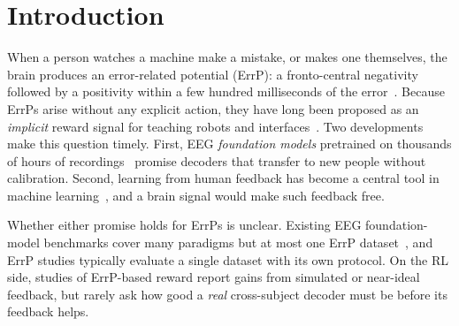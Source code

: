 \section{Introduction}
\label{sec:intro}

When a person watches a machine make a mistake, or makes one themselves, the brain produces an
error-related potential (ErrP): a fronto-central negativity followed by a positivity within a few hundred
milliseconds of the error~\citep{chavarriaga2014errare}. Because ErrPs arise without any explicit action,
they have long been proposed as an \emph{implicit} reward signal for teaching robots and
interfaces~\citep{iturrate2015teaching,kim2017intrinsic,salazargomez2017correcting,xu2021accelerating}.
Two developments make this question timely. First, EEG \emph{foundation models} pretrained on thousands of
hours of recordings~\citep{jiang2024labram,wang2024eegpt,wang2025cbramod} promise decoders that transfer
to new people without calibration. Second, learning from human feedback has become a central tool in
machine learning~\citep{christiano2017deep}, and a brain signal would make such feedback free.

Whether either promise holds for ErrPs is unclear. Existing EEG foundation-model benchmarks cover many
paradigms but at most one ErrP dataset~\citep{lu2026omnieegbench,liu2026eegfmcompass}, and ErrP studies typically
evaluate a single dataset with its own protocol. On the RL side, studies of ErrP-based reward report
gains from simulated or near-ideal feedback, but rarely ask how good a \emph{real} cross-subject decoder must
be before its feedback helps.

